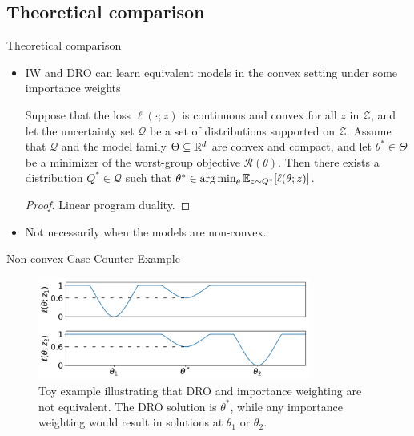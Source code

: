 \documentclass{beamer}
\begin{document}
\subsection{Theoretical comparison}
\begin{viterbiframe}{Theoretical comparison}

    \begin{itemize}
        \item IW and DRO can learn equivalent models in the \alert{convex} setting under some importance weights 
        
        \pause
        \begin{proposition}\label{prop:convex-reweight}
          Suppose that the loss $\ell(\cdot; z)$ is \alert{continuous} and \alert{convex} for all $z$ in $\mathcal{Z}$,
          and let the uncertainty set $\mathcal{Q}$ be a set of distributions supported on $\mathcal{Z}$.
          Assume that $\mathcal{Q}$ and the model family $\Theta \subseteq \mathbb{R}^d$ are \alert{convex} and \alert{compact},
          and let $\theta^* \in \Theta$ be a \alert{minimizer of the worst-group} objective $\mathcal{R}(\theta)$.
          Then there exists a distribution $Q^* \in \mathcal{Q}$ such that $\theta^* \in \operatorname*{arg\,min}_\theta \mathbb{E}_{z \sim Q^*} [\ell(\theta;z)]$.
        \end{proposition}
        \begin{proof}
        Linear program duality.
        \end{proof}
        
        \item Not necessarily when the models are \alert{non-convex}.
    \end{itemize}
\end{viterbiframe}

\begin{viterbiframe}{Non-convex Case}
Counter Example
\begin{figure}[th]
      \centering
      \includegraphics[width=0.8\textwidth]{img/counterexample.pdf}
      \caption{
        Toy example illustrating that \alert{DRO} and \alert{importance weighting} are \alert{not equivalent}. The DRO solution is $\theta^*$, while any importance weighting would result in solutions at $\theta_1$ or $\theta_2$.
      }\label{fig:DRO_counterexample}
    \end{figure}
\end{viterbiframe}
\end{document}
